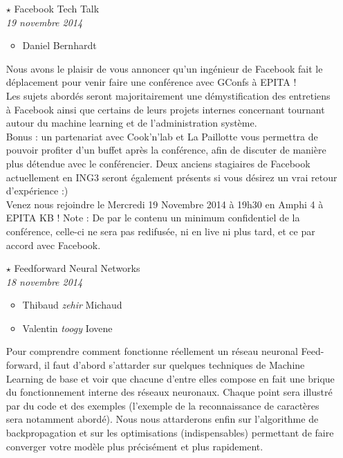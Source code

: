 \documentclass[a4paper]{article}
\begin{document}
\begin{itemize}
    \item[$\star$] Facebook Tech Talk\\
        \emph{19 novembre 2014}
        \begin{itemize}
            \item Daniel Bernhardt
        \end{itemize}

        Nous avons le plaisir de vous annoncer qu'un ingénieur de Facebook fait
        le déplacement pour venir faire une conférence avec GConfs à EPITA !\\

        Les sujets abordés seront majoritairement une démystification des
        entretiens à Facebook ainsi que certains de leurs projets internes
        concernant tournant autour du machine learning et de l'administration
        système.\\

        Bonus : un partenariat avec Cook'n'lab et La Paillotte vous permettra
        de pouvoir profiter d'un buffet après la conférence, afin de discuter
        de manière plus détendue avec le conférencier. Deux anciens stagiaires
        de Facebook actuellement en ING3 seront également présents si vous
        désirez un vrai retour d'expérience :)\\

        Venez nous rejoindre le Mercredi 19 Novembre 2014 à 19h30 en Amphi 4 à
        EPITA KB ! Note : De par le contenu un minimum confidentiel de la
        conférence, celle-ci ne sera pas redifusée, ni en live ni plus tard, et
        ce par accord avec Facebook.


        \vspace{0.3cm}

    \item[$\star$] Feedforward Neural Networks\\
        \emph{18 novembre 2014}
        \begin{itemize}
            \item Thibaud \emph{zehir} Michaud
            \item Valentin \emph{toogy} Iovene
        \end{itemize}

        Pour comprendre comment fonctionne réellement un réseau neuronal
        Feed-forward, il faut d'abord s'attarder sur quelques techniques de
        Machine Learning de base et voir que chacune d'entre elles compose en
        fait une brique du fonctionnement interne des réseaux neuronaux. Chaque
        point sera illustré par du code et des exemples (l'exemple de la
        reconnaissance de caractères sera notamment abordé). Nous nous
        attarderons enfin sur l'algorithme de backpropagation et sur les
        optimisations (indispensables) permettant de faire converger votre
        modèle plus précisément et plus rapidement.


\end{itemize}
\end{document}
